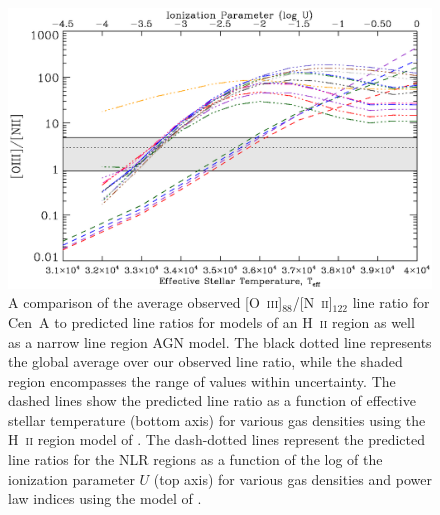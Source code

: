 \begin{figure}
\includegraphics[width=\columnwidth]{ch4/CenA_OIIIonNII_plot_v2_cropped}
\caption[A comparison of the \mbox{[O~\textsc{iii}]$_{88}$/[N~\textsc{ii}]$_{122}$} line ratio for Centaurus~A to H~\textsc{ii} region and narrow line region AGN models]{A comparison of the average observed [O~\textsc{iii}]$_{88}$/[N~\textsc{ii}]$_{122}$ line ratio for Cen~A to predicted line ratios for models of an H~\textsc{ii} region as well as a narrow line region AGN model. The black dotted line represents the global average over our observed line ratio, while the shaded region encompasses the range of values within uncertainty.  The dashed lines show the predicted line ratio as a function of effective stellar temperature (bottom axis) for various gas densities using the H~\textsc{ii} region model of \citet{1985ApJS...57..349R}.  The dash-dotted lines represent the predicted line ratios for the NLR regions as a function of the log of the ionization parameter $U$ (top axis) for various gas densities and power law indices using the model of \citet{2004ApJS..153....9G}.}
\label{fig:OIIIonNII}
\end{figure}

